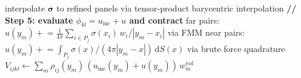 \documentclass[preprint,12pt]{elsarticle}
\newcommand{\V}[1]{\boldsymbol{#1}}
\newcommand{\abs}[1]{\left|#1\right|}
\begin{document}
\begin{algorithm}[H]
\begin{algorithmic}[1]
        \State interpolate $\boldsymbol{\sigma}$ to refined panels via
               tensor-product barycentric interpolation
        \State \textbf{// Step 5: evaluate $\phi_{kl} = u_{\mathrm{inc}} + u$ and contract}
        \State far pairs:
               $u(y_m) \mathrel{+}= \tfrac{1}{4\pi}\sum_{i\in P_j}
               \sigma(x_i)\,w_i/\abs{y_m{-}x_i}$ \quad via FMM
        \State near pairs:
               $u(y_m) \mathrel{+}= \int_{P_j} \sigma(x)/({4\pi\abs{y_m{-}x}})\,
               \mathrm{d}S(x)$ \quad via brute force quadrature
        \State \Return $V_{ijkl} \gets
            \sum_m \rho_{ij}(y_m)\,(u_{\mathrm{inc}}(y_m){+}u(y_m))\,w_m^{\mathrm{vol}}$
    \end{algorithmic}
\end{algorithm}



\end{document}
